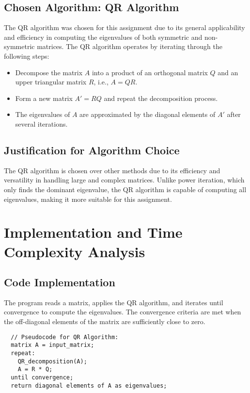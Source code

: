 \documentclass[12pt]{article}
\begin{document}
\subsection{Chosen Algorithm: QR Algorithm}
The QR algorithm was chosen for this assignment due to its general applicability and efficiency in computing the eigenvalues of both symmetric and non-symmetric matrices. The QR algorithm operates by iterating through the following steps:

\begin{itemize}
    \item Decompose the matrix \( A \) into a product of an orthogonal matrix \( Q \) and an upper triangular matrix \( R \), i.e., \( A = QR \).
    \item Form a new matrix \( A' = RQ \) and repeat the decomposition process.
    \item The eigenvalues of \( A \) are approximated by the diagonal elements of \( A' \) after several iterations.
\end{itemize}

\subsection{Justification for Algorithm Choice}
The QR algorithm is chosen over other methods due to its efficiency and versatility in handling large and complex matrices. Unlike power iteration, which only finds the dominant eigenvalue, the QR algorithm is capable of computing all eigenvalues, making it more suitable for this assignment.

\section{Implementation and Time Complexity Analysis}

\subsection{Code Implementation}
The program reads a matrix, applies the QR algorithm, and iterates until convergence to compute the eigenvalues. The convergence criteria are met when the off-diagonal elements of the matrix are sufficiently close to zero.

\begin{verbatim}
  // Pseudocode for QR Algorithm:
  matrix A = input_matrix;
  repeat:
    QR_decomposition(A);
    A = R * Q;
  until convergence;
  return diagonal elements of A as eigenvalues;
\end{verbatim}
\end{document}
